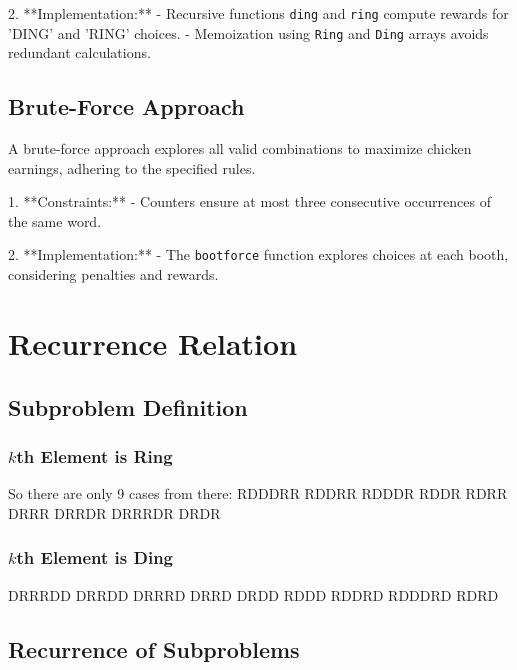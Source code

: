 \documentclass{article}
\begin{document}
    


2. **Implementation:**
   - Recursive functions \texttt{ding} and \texttt{ring} compute rewards for 'DING' and 'RING' choices.
   - Memoization using \texttt{Ring} and \texttt{Ding} arrays avoids redundant calculations.

\subsection{Brute-Force Approach}

A brute-force approach explores all valid combinations to maximize chicken earnings, adhering to the specified rules.

1. **Constraints:**
   - Counters ensure at most three consecutive occurrences of the same word.

2. **Implementation:**
   - The \texttt{bootforce} function explores choices at each booth, considering penalties and rewards.







\section{Recurrence Relation}

\subsection{Subproblem Definition}

\subsubsection{\(k\)th Element is Ring}
    So there are only 9 cases from there:
    RDDDRR
    RDDRR
    RDDDR
    RDDR
    RDRR
    DRRR
    DRRDR
    DRRRDR
    DRDR

\subsubsection{\(k\)th Element is Ding}
    DRRRDD
    DRRDD
    DRRRD
    DRRD
    DRDD
    RDDD
    RDDRD
    RDDDRD
    RDRD

\subsection{Recurrence of Subproblems}
\end{document}
